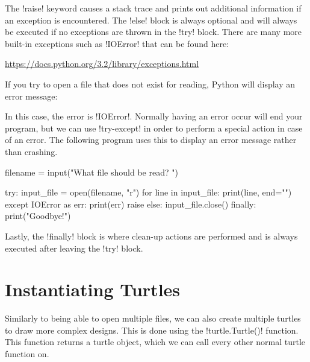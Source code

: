 \documentclass[11pt]{cselabheader}
\begin{document}
The \pythoninline!raise! keyword causes a stack trace and prints out additional
information if an exception is encountered.  The \pythoninline!else! block is
always optional and will always be executed if no exceptions are thrown in the
\pythoninline!try! block.  There are many more built-in exceptions such as
\pythoninline!IOError! that can be found here:

\begin{center}
\url{https://docs.python.org/3.2/library/exceptions.html}
\end{center}

If you try to open a file that does not exist for reading, Python will display
an error message:


In this case, the error is \pythoninline!IOError!. Normally having an
error occur will end your program, but we can use \pythoninline!try-except! in
order to perform a special action in case of an error. The following program
uses this to display an error message rather than crashing.

\begin{python3code}
filename = input("What file should be read? ")

try:
    input_file = open(filename, "r")
    for line in input_file:
        print(line, end="")
except IOError as err:
    print(err)
    raise
else:
    input_file.close()
finally:
    print("Goodbye!")
\end{python3code}

Lastly, the \pythoninline!finally! block is where clean-up actions are performed
and is always executed after leaving the \pythoninline!try! block.


\pagebreak
\section{Instantiating Turtles}
Similarly to being able to open multiple files, we can also create multiple
turtles to draw more complex designs. This is done using the
\pythoninline!turtle.Turtle()! function. This function returns a turtle object,
which we can call every other normal turtle function on.
\end{document}
